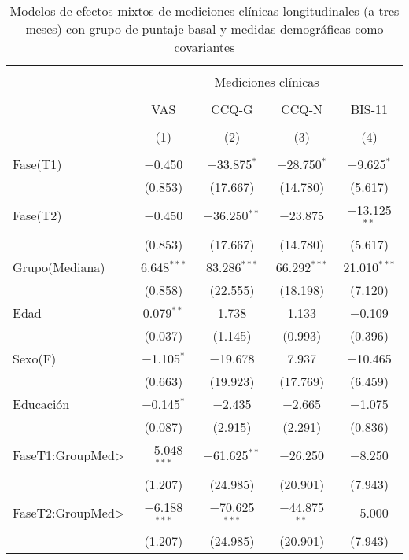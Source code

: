 \begin{table}[!htbp] \centering
    \small
  \caption{Modelos de efectos mixtos de mediciones clínicas longitudinales (a tres meses) con grupo de puntaje basal y medidas demográficas como covariantes}
  \label{tab:clin2}
\begin{tabular}{@{\extracolsep{5pt}}lcccc}
\\[-1.8ex]\hline
\hline \\[-1.8ex]
 & \multicolumn{4}{c}{Mediciones clínicas } \\
\cline{2-5}
\\[-1.8ex] & VAS & CCQ-G & CCQ-N & BIS-11\\
\\[-1.8ex] & (1) & (2) & (3) & (4) \\
\hline \\[-1.8ex]
 Fase(T1) & $-$0.450 & $-$33.875$^{*}$ & $-$28.750$^{*}$ & $-$9.625$^{*}$ \\
  & (0.853) & (17.667) & (14.780) & (5.617) \\
  Fase(T2) & $-$0.450 & $-$36.250$^{**}$ & $-$23.875 & $-$13.125$^{**}$ \\
  & (0.853) & (17.667) & (14.780) & (5.617) \\
  Grupo(Mediana) & 6.648$^{***}$ & 83.286$^{***}$ & 66.292$^{***}$ & 21.010$^{***}$ \\
  & (0.858) &  (22.555) &(18.198) & (7.120) \\
  Edad & 0.079$^{**}$ & 1.738 & 1.133 & $-$0.109 \\
  & (0.037) & (1.145) & (0.993) & (0.396) \\
  Sexo(F) & $-$1.105$^{*}$ & $-$19.678 & 7.937 & $-$10.465 \\
  & (0.663) & (19.923) & (17.769) & (6.459) \\
  Educación & $-$0.145$^{*}$ & $-$2.435 & $-$2.665 & $-$1.075 \\
  & (0.087) & (2.915) & (2.291) & (0.836) \\
  FaseT1:GroupMed\textgreater  & $-$5.048$^{***}$ &  $-$61.625$^{**}$  & $-$26.250  & $-$8.250 \\
  & (1.207) & (24.985) & (20.901) & (7.943) \\
  FaseT2:GroupMed\textgreater  & $-$6.188$^{***}$ & $-$70.625$^{***}$  & $-$44.875$^{**}$  & $-$5.000 \\
  & (1.207) & (24.985) & (20.901) & (7.943) \\

\end{tabular}
\end{table}
